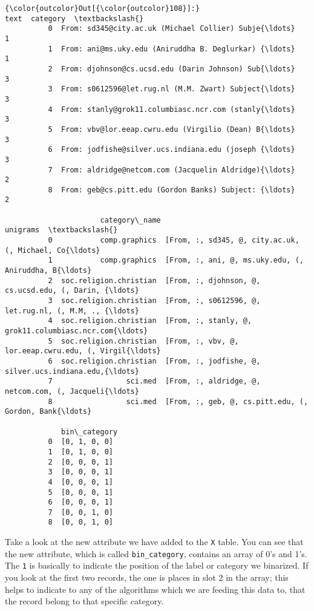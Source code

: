 \documentclass[11pt]{article}
\begin{document}
\begin{Verbatim}[commandchars=\\\{\}]
{\color{outcolor}Out[{\color{outcolor}108}]:}                                                 text  category  \textbackslash{}
          0  From: sd345@city.ac.uk (Michael Collier) Subje{\ldots}         1   
          1  From: ani@ms.uky.edu (Aniruddha B. Deglurkar) {\ldots}         1   
          2  From: djohnson@cs.ucsd.edu (Darin Johnson) Sub{\ldots}         3   
          3  From: s0612596@let.rug.nl (M.M. Zwart) Subject{\ldots}         3   
          4  From: stanly@grok11.columbiasc.ncr.com (stanly{\ldots}         3   
          5  From: vbv@lor.eeap.cwru.edu (Virgilio (Dean) B{\ldots}         3   
          6  From: jodfishe@silver.ucs.indiana.edu (joseph {\ldots}         3   
          7  From: aldridge@netcom.com (Jacquelin Aldridge){\ldots}         2   
          8  From: geb@cs.pitt.edu (Gordon Banks) Subject: {\ldots}         2   
          
                      category\_name                                           unigrams  \textbackslash{}
          0           comp.graphics  [From, :, sd345, @, city.ac.uk, (, Michael, Co{\ldots}   
          1           comp.graphics  [From, :, ani, @, ms.uky.edu, (, Aniruddha, B{\ldots}   
          2  soc.religion.christian  [From, :, djohnson, @, cs.ucsd.edu, (, Darin, {\ldots}   
          3  soc.religion.christian  [From, :, s0612596, @, let.rug.nl, (, M.M, ., {\ldots}   
          4  soc.religion.christian  [From, :, stanly, @, grok11.columbiasc.ncr.com{\ldots}   
          5  soc.religion.christian  [From, :, vbv, @, lor.eeap.cwru.edu, (, Virgil{\ldots}   
          6  soc.religion.christian  [From, :, jodfishe, @, silver.ucs.indiana.edu,{\ldots}   
          7                 sci.med  [From, :, aldridge, @, netcom.com, (, Jacqueli{\ldots}   
          8                 sci.med  [From, :, geb, @, cs.pitt.edu, (, Gordon, Bank{\ldots}   
          
             bin\_category  
          0  [0, 1, 0, 0]  
          1  [0, 1, 0, 0]  
          2  [0, 0, 0, 1]  
          3  [0, 0, 0, 1]  
          4  [0, 0, 0, 1]  
          5  [0, 0, 0, 1]  
          6  [0, 0, 0, 1]  
          7  [0, 0, 1, 0]  
          8  [0, 0, 1, 0]  
\end{Verbatim}
            
    Take a look at the new attribute we have added to the \texttt{X} table.
You can see that the new attribute, which is called
\texttt{bin\_category}, contains an array of 0's and 1's. The \texttt{1}
is basically to indicate the position of the label or category we
binarized. If you look at the first two records, the one is places in
slot 2 in the array; this helps to indicate to any of the algorithms
which we are feeding this data to, that the record belong to that
specific category.
\end{document}
